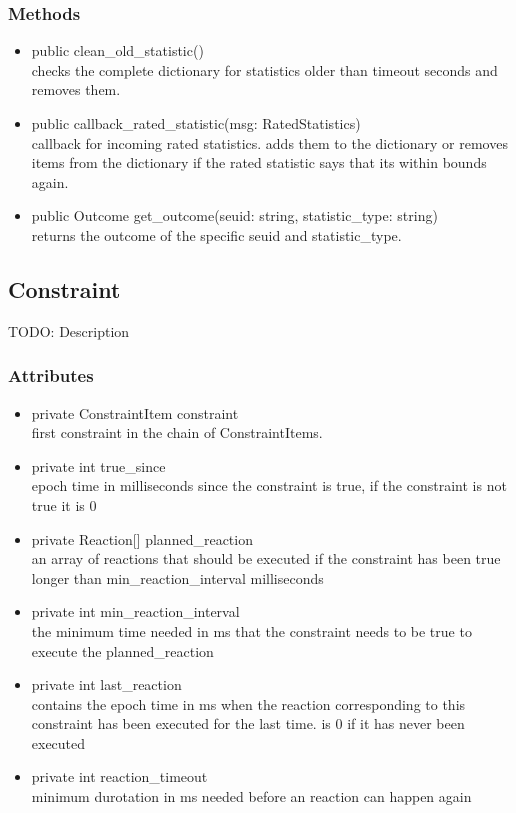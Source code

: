 \subsubsection{Methods}
\begin{itemize}
	\item  public clean\_old\_statistic()\\
		checks the complete dictionary for statistics older than timeout seconds and removes them.
	\item public callback\_rated\_statistic(msg: RatedStatistics)\\
		callback for incoming rated statistics. adds them to the dictionary or removes items from the dictionary if the rated statistic says that its within bounds again. 
	\item public Outcome get\_outcome(seuid: string, statistic\_type: string)\\
		returns the outcome of the specific seuid and statistic\_type.
\end{itemize}

\subsection{Constraint }
TODO: Description


\subsubsection{Attributes}
\begin{itemize}
	\item private  ConstraintItem constraint\\
	first constraint in the chain of ConstraintItems.
	\item private  int true\_since\\
	epoch time in milliseconds since the constraint is true,
	if the constraint is not true it is 0
	\item private  Reaction[] planned\_reaction\\
	an array of reactions that should be executed if the constraint has been true longer than min\_reaction\_interval milliseconds
	\item private  int min\_reaction\_interval\\
	the minimum time needed in ms that the constraint needs to be true to execute the planned\_reaction
	\item private  int last\_reaction\\
	contains the epoch time in ms when the reaction corresponding to this constraint has been executed for the last time.
		is 0 if it has never been executed
	\item private  int reaction\_timeout\\
	minimum durotation in ms needed before an reaction can happen again
\end{itemize}
